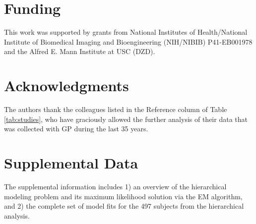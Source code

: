 \documentclass[utf8]{frontiersSCNS} %
\begin{document}
\section*{Funding}
This work was supported by grants from National Institutes of Health/National Institute of Biomedical Imaging and Bioengineering (NIH/NIBIB) P41-EB001978 and the Alfred E. Mann Institute at USC (DZD).

\section*{Acknowledgments}
The authors thank the colleagues listed in the Reference column of Table \ref{tab:studies}, who have graciously allowed the further analysis of their data that was collected with GP during the last 35 years.

\section*{Supplemental Data}
The supplemental information includes 1) an overview of the hierarchical modeling problem and its maximum likelihood solution via the EM algorithm, and 2) the complete set of model fits for the 497 subjects from the hierarchical analysis.




\end{document}
